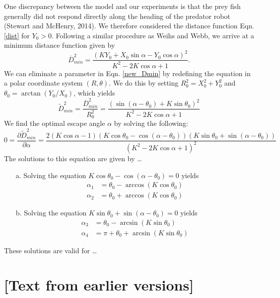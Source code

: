\documentclass[12pt]{article}
\def\ds{\displaystyle}
\def\d{\partial}
\newcommand{\ol}{\overline}
\begin{document}
One discrepancy between the model and our experiments is that the prey fish generally did not respond directly along the heading of the predator robot (Stewart and McHenry, 2014). We therefore considered the distance function Eqn. \ref{dist} for $Y_0>0$. Following a similar procedure as Weihs and Webb, we arrive at a minimum distance function given by
% 
\begin{equation}
\ol D^2_{min}=\frac{(K Y_0+X_0 \sin \alpha -Y_0\cos \alpha)^2}{K^2-2 K \cos \alpha +1}. 
\label{new_Dmin}
\end{equation}
%
We can eliminate a parameter in Eqn. \ref{new_Dmin} by redefining the equation in a polar coordinate system $(R, \theta)$. We do this by setting $R_0^2 = X_0^2 + Y_0^2$ and $\theta_0 = \arctan(Y_0/X_0)$, which yields
%
\begin{equation}
\widetilde{D}^2_{min}= \ds\frac{\ol{D}^2_{min}}{R_0^2 }=
\ds\frac{\left ( \sin(\alpha - \theta_0) + K \sin \theta_0 \right )^2}{K^2-2 K \cos \alpha +1} 
\label{Dmin_polar}
\end{equation}
%
We find the optimal escape angle $\alpha$ by solving the following:
%
\begin{equation}
0 = \frac{\d \widetilde{D}^2_{min}}{\d \alpha} = 
\frac{2(K \cos \alpha - 1)(K\cos \theta_0 - \cos(\alpha - \theta_0))
(K\sin \theta_0 + \sin(\alpha -\theta_0))}
{(K^2 - 2K \cos \alpha + 1)^2}
\end{equation} 
%
The solutions to this equation are given by \dots
\begin{enumerate}
\item[a.] Solving the equation $K\cos \theta_0 - \cos(\alpha - \theta_0) = 0$ yields
%
\begin{align*}
\alpha_1 & = \theta_0 - \arccos(K \cos \theta_0) \\
\alpha_2 & = \theta_0 + \arccos(K \cos \theta_0)
\end{align*}
%
\item[b.] Solving the equation $K\sin \theta_0 + \sin(\alpha -\theta_0) = 0$ yields
%
\begin{align*}
\alpha_3 & = \theta_0 - \arcsin(K \sin \theta_0) \\
\alpha_4 & = \pi + \theta_0 + \arcsin(K \sin \theta_0)
\end{align*}
%
\end{enumerate}
These solutions are valid for \dots



\section{[Text from earlier versions]}
\end{document}
